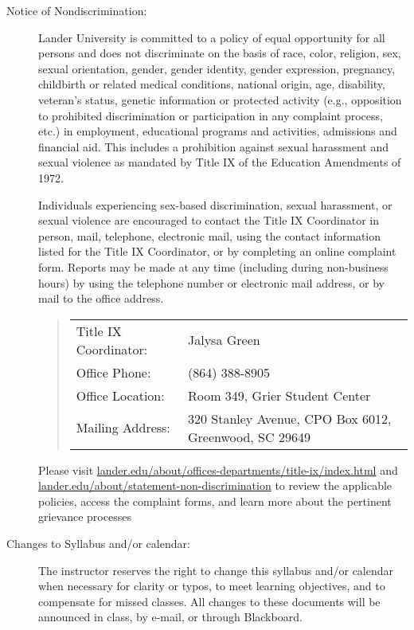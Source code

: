 \message{ !name(policies.tex)}\documentclass{article}
\begin{document}
\begin{description}
\item[Notice of Nondiscrimination:]

  Lander University is committed to a policy of equal opportunity for all persons and does not discriminate on the basis of race, color, religion, sex, sexual orientation, gender, gender identity, gender expression, pregnancy, childbirth or related medical conditions, national origin, age, disability, veteran’s status, genetic information or protected activity (e.g., opposition to prohibited discrimination or participation in any complaint process, etc.) in employment, educational programs and activities, admissions and financial aid. This includes a prohibition against sexual harassment and sexual violence as mandated by Title IX of the Education Amendments of 1972.

  Individuals experiencing sex-based discrimination, sexual harassment, or sexual violence are encouraged to contact the Title IX Coordinator in person, mail, telephone, electronic mail, using the contact information listed for the Title IX Coordinator, or by completing an online complaint form. Reports may be made at any time (including during non-business hours) by using the telephone number or electronic mail address, or by mail to the office address.

\begin{quote}
  \begin{tabular}{@{}ll@{}}
    Title IX Coordinator: & Jalysa Green\\
    Office Phone: & (864) 388-8905\\
    Office Location: & Room 349, Grier Student Center\\
    Mailing Address: & 320 Stanley Avenue, CPO Box 6012, Greenwood, SC 29649
  \end{tabular}
\end{quote}

  Please visit \href{https://www.lander.edu/about/offices-departments/title-ix/index.html}{lander.edu/about/offices-departments/title-ix/index.html} and \href{https://www.lander.edu/about/statement-non-discrimination}{lander.edu/about/\allowbreak statement\allowbreak -non\allowbreak -discrimination} to review the applicable policies, access the complaint forms, and learn more about the pertinent grievance processes

\item[Changes to Syllabus and/or calendar:]
  The instructor reserves the right to change this syllabus and/or calendar when necessary for clarity or typos, to meet learning objectives, and to compensate for missed classes. All changes to these documents will be announced in class, by e-mail, or through Blackboard.

  \end{description}
\end{document}
